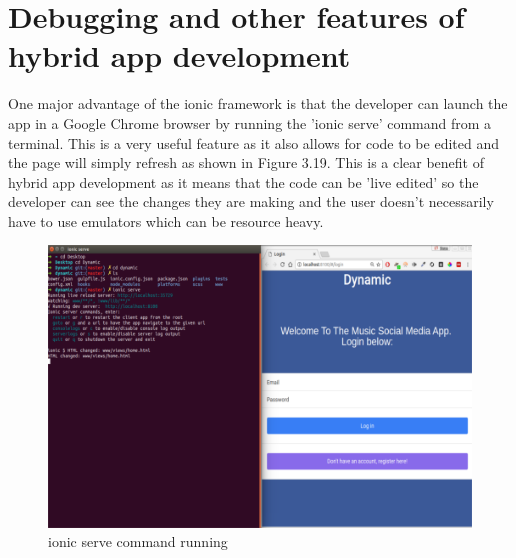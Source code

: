 \section{Debugging and other features of hybrid app development}
One major advantage of the ionic framework is that the developer can launch the app in a Google Chrome browser by running the 'ionic serve' command from a terminal. This is a very useful feature as it also allows for code to be edited and the page will simply refresh as shown in Figure 3.19. This is a clear benefit of hybrid app development as it means that the code can be 'live edited' so the developer can see the changes they are making and the user doesn't necessarily have to use emulators which can be resource heavy.
\begin{center}
\begin{figure}[H]
\includegraphics[scale=0.45]{images/chrome}
\caption{ionic serve command running}
\end{figure}
\end{center}


